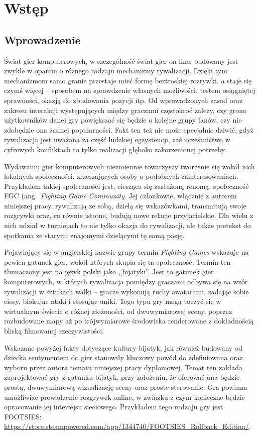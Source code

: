 \chapter{Wstęp}
\section{Wprowadzenie}
Świat gier komputerowych, w szczególność świat gier on-line, budowany jest zwykle w oparciu o różnego rodzaju mechanizmy rywalizacji. Dzięki tym mechanizmom samo granie przestaje mieć formę beztroskiej rozrywki, a staje się czymś więcej -- sposobem na sprawdzenie własnych możliwości, testem osiągniętej sprawności, okazją do zbudowania pozycji itp. Od wprowadzonych zasad oraz zakresu interakcji występujących między graczami częstokroć zależy, czy grono użytkowników danej gry powiększać się będzie o kolejne grupy fanów, czy nie zdobędzie ona żadnej popularności. Fakt ten też nie może specjalnie dziwić, gdyż rywalizacja jest uważana za część ludzkiej egzystencji, zaś uczestnictwo w cyfrowych konfliktach to tylko realizacji głęboko zakorzenionej potrzeby.

Wydawaniu gier komputerowych niezmiennie towarzyszy tworzenie się wokół nich lokalnych społeczności, zrzeszających osoby o podobnych zainteresowaniach. Przykładem takiej społeczności jest, ciesząca się zasłużoną renomą, społeczność FGC (ang.~\emph{Fighting Game Community}. Jej członkowie, włącznie z autorem niniejszej pracy, rywalizują ze sobą, dzielą się wskazówkami, transmitują swoje rozgrywki oraz, co równie istotne, budują nowe relacje przyjacielskie. Dla wielu z nich udział w turniejach to nie tylko okazja do rywalizacji, ale także pretekst do spotkania ze starymi znajomymi dzielącymi tę samą pasję.

Pojawiający się w angielskiej nazwie grupy termin \emph{Fighting Games} wskazuje na pewien gatunek gier, wokół których skupia się ta społeczność. Termin ten tłumaczony jest na język polski jako ,,bijatyki''. Jest to gatunek gier komputerowych, w których rywalizacja pomiędzy graczami odbywa się na wzór rywalizacji w sztukach walki -- gracze wykonują ruchy awatarami, zadając sobie ciosy, blokując ataki i stosując uniki. Tego typu gry mogą toczyć się w wirtualnym świecie o różnej złożoności, od dwuwymiarowej sceny, poprzez rozbudowane mapy aż po trójwymiarowe środowiska renderowane z dokładnością bliską filmowanej rzeczywistości.

Wskazane powyżej fakty dotyczące kultury bijatyk, jak również budowany od dziecka sentymentem do gier stanowiły kluczowy powód do zdefiniowana oraz wyboru przez autora tematu niniejszej pracy dyplomowej. Temat ten zakłada zaprojektować gry z gatunku bijatyk, przy założeniu, że oferować ona będzie prostą, dwuwymiarową wizualizację sceny oraz proste sterowanie. Gra powinna umożliwiać prowadzenie rozgrywek online, w związku z czym konieczne będzie opracowanie jej interfejsu sieciowego. Przykładem tego rodzaju gry jest FOOTSIES: \url{https://store.steampowered.com/app/1344740/FOOTSIES_Rollback_Edition/}. 


